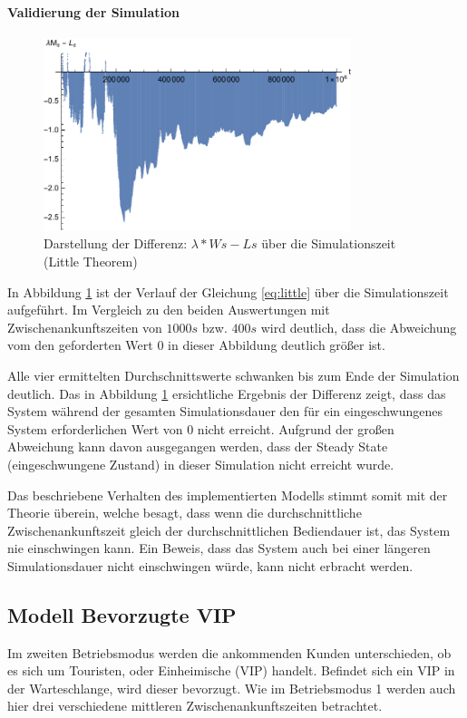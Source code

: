 \paragraph{Validierung der Simulation}
\begin{figure}[htpb]
	\centering
	\includegraphics[width=0.8\textwidth]{abbildungen/1_Phone/Arrival_100_Serve_100_dur_1000000_Skip_0/LittleSystem.pdf}
	\caption{Darstellung der Differenz: $\lambda * Ws - Ls$ über die Simulationszeit (Little Theorem)}
	\label{fig:LittleSystem100}
\end{figure} 
In Abbildung \ref{fig:LittleSystem100} ist der Verlauf der Gleichung \ref{eq:little} über die Simulationszeit aufgeführt. Im Vergleich zu den beiden Auswertungen mit Zwischenankunftszeiten von $1000s$ bzw. $400s$ wird deutlich, dass die Abweichung vom den geforderten Wert $0$ in dieser Abbildung deutlich größer ist.  

Alle vier ermittelten Durchschnittswerte schwanken bis zum Ende der Simulation deutlich. Das in Abbildung \ref{fig:LittleSystem100} ersichtliche Ergebnis der Differenz zeigt, dass das System während der gesamten Simulationsdauer den für ein eingeschwungenes System erforderlichen Wert von $0$ nicht erreicht. Aufgrund der großen Abweichung kann davon ausgegangen werden, dass der Steady State (eingeschwungene Zustand) in dieser Simulation nicht erreicht wurde. 

Das beschriebene Verhalten des implementierten Modells stimmt somit mit der Theorie überein, welche besagt, dass wenn die durchschnittliche Zwischenankunftszeit gleich der durchschnittlichen Bediendauer ist, das System nie einschwingen kann. Ein Beweis, dass das System auch bei einer längeren Simulationsdauer nicht einschwingen würde, kann nicht erbracht werden.

\subsection{Modell \glqq Bevorzugte VIP\grqq} 
Im zweiten Betriebsmodus werden die ankommenden Kunden unterschieden, ob es sich um Touristen, oder Einheimische (VIP) handelt. Befindet sich ein VIP in der Warteschlange, wird dieser bevorzugt. Wie im Betriebsmodus 1 werden auch hier drei verschiedene mittleren Zwischenankunftszeiten betrachtet.
